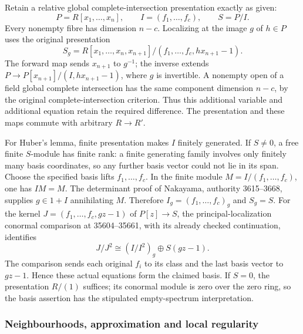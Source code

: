 Retain a relative global complete-intersection presentation exactly as given: \[
P=R[x_1,\ldots,x_n],\qquad I=(f_1,\ldots,f_c),\qquad S=P/I.
\] Every nonempty fibre has dimension \(n-c\). Localizing at the image \(g\) of \(h\in P\) uses the original presentation \[
S_g=R[x_1,\ldots,x_n,x_{n+1}]/(f_1,\ldots,f_c,hx_{n+1}-1).
\] The forward map sends \(x_{n+1}\) to \(g^{-1}\); the inverse extends \(P\to P[x_{n+1}]/(I,hx_{n+1}-1)\), where \(g\) is invertible. A nonempty open of a field global complete intersection has the same component dimension \(n-c\), by the original complete-intersection criterion. Thus this additional variable and additional equation retain the required difference. The presentation and these maps commute with arbitrary \(R\to R'\).

For Huber's lemma, finite presentation makes \(I\) finitely generated. If \(S\ne0\), a free finite \(S\)-module has finite rank: a finite generating family involves only finitely many basis coordinates, so any further basis vector could not lie in its span. Choose the specified basis lifts \(f_1,\ldots,f_c\). In the finite module \(M=I/(f_1,\ldots,f_c)\), one has \(IM=M\). The determinant proof of Nakayama, authority 3615--3668, supplies \(g\in1+I\) annihilating \(M\). Therefore \(I_g=(f_1,\ldots,f_c)_g\) and \(S_g=S\). For the kernel \(J=(f_1,\ldots,f_c,gz-1)\) of \(P[z]\to S\), the principal-localization conormal comparison at 35604--35661, with its already checked continuation, identifies \[
J/J^2\cong (I/I^2)_g\oplus S(gz-1).
\] The comparison sends each original \(f_i\) to its class and the last basis vector to \(gz-1\). Hence these actual equations form the claimed basis. If \(S=0\), the presentation \(R/(1)\) suffices; its conormal module is zero over the zero ring, so the basis assertion has the stipulated empty-spectrum interpretation.

\subsubsection{Neighbourhoods, approximation and local regularity}\label{algebra-proof-046-neighbourhoods-approximation-and-local-regularity}

